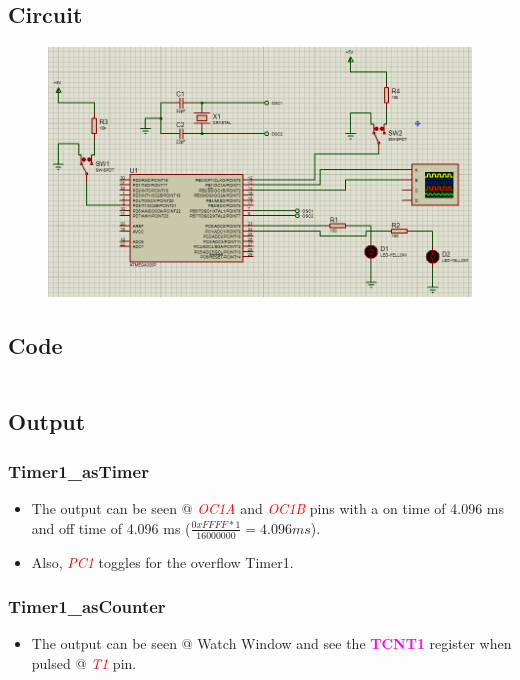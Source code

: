 \documentclass[oneside]{book}
\newcommand{\pinFormat}[1]{\emph{\textcolor{red}{#1}}}
\newcommand{\regFormat}[1]{\textbf{\textcolor{magenta}{#1}}}
\begin{document}
\subsection{Circuit}
\begin{figure}[H]
    \centering
    \includegraphics[height=0.2\textheight]{TimerCounter1_NormalMode.png}
\end{figure}
\subsection{Code}
\inputminted[breaklines, bgcolor=black]{c}{../programFiles/TimerCounter1_NormalMode.c}
\subsection{Output}
\subsubsection{Timer1\_asTimer}
\begin{itemize}
    \item The output can be seen @ \pinFormat{OC1A} and \pinFormat{OC1B} pins with a on time of 4.096 ms and off time of 4.096 ms ($\frac{0xFFFF * 1}{16000000} = 4.096 ms$).
    \item Also, \pinFormat{PC1} toggles for the overflow Timer1.
\end{itemize}
\subsubsection{Timer1\_asCounter}
\begin{itemize}
    \item The output can be seen @ Watch Window and see the \regFormat{TCNT1} register when pulsed @ \pinFormat{T1} pin.
\end{itemize}
\end{document}
